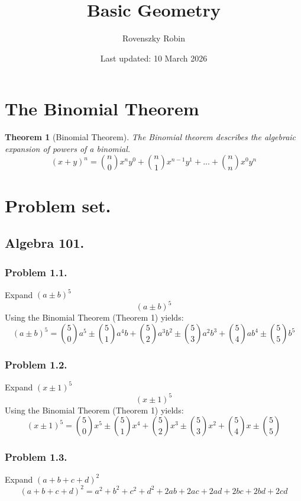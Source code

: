 \documentclass{article}
\title{Basic Geometry}
\author{Rovenszky Robin}
\date{Last updated: 10 March 2026}
\newtheorem{theorem}{Theorem}
\begin{document}
\maketitle

\section{The Binomial Theorem}
\begin{theorem}[Binomial Theorem]
The Binomial theorem describes the algebraic expansion of powers of a binomial.
\begin{equation}
    (x+y)^n = \binom{n}{0}x^ny^0 + \binom{n}{1}x^{n-1}y^1 + ... + \binom{n}{n}x^0y^n
\end{equation}
\end{theorem}

\section{Problem set.}
\subsection{Algebra 101.}
\subsubsection{Problem 1.1.}
Expand $(a\pm b)^5$
\begin{equation}
    (a \pm b)^5
\end{equation}
Using the Binomial Theorem (Theorem 1) yields:
\begin{equation}
    (a \pm b)^5 = \binom{5}{0}a^5 \pm \binom{5}{1}a^4b + \binom{5}{2}a^3b^2 \pm \binom{5}{3}a^2b^3 + \binom{5}{4}ab^4 \pm \binom{5}{5}b^5
\end{equation}

\subsubsection{Problem 1.2.}
Expand $(x\pm 1)^5$
\begin{equation}
    (x \pm 1)^5
\end{equation}
Using the Binomial Theorem (Theorem 1) yields:
\begin{equation}
    (x \pm 1)^5 = \binom{5}{0}x^5\pm \binom{5}{1}x^4 + \binom{5}{2}x^3 \pm \binom{5}{3}x^2 + \binom{5}{4}x \pm \binom{5}{5}
\end{equation}

\subsubsection{Problem 1.3.}
Expand $(a+b+c+d)^2$
\begin{equation}
    (a+b+c+d)^2 = a^2 + b^2 + c^2 + d^2 + 2ab + 2ac + 2ad + 2bc + 2bd + 2cd
\end{equation}
\end{document}
